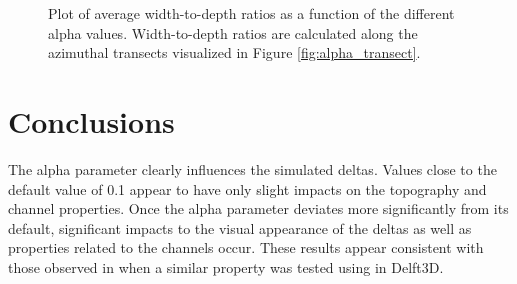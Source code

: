 \begin{figure}[!ht]
	\caption{Plot of average width-to-depth ratios as a function of the different alpha values. Width-to-depth ratios are calculated along the azimuthal transects visualized in Figure \ref{fig:alpha_transect}.}
	\label{fig:alpha_wd}
\end{figure}

\section{Conclusions}
The alpha parameter clearly influences the simulated deltas.
Values close to the default value of 0.1 appear to have only slight impacts on the topography and channel properties.
Once the alpha parameter deviates more significantly from its default, significant impacts to the visual appearance of the deltas as well as properties related to the channels occur.
These results appear consistent with those observed in \citet{Baar2019} when a similar property was tested using in Delft3D.

\clearpage

